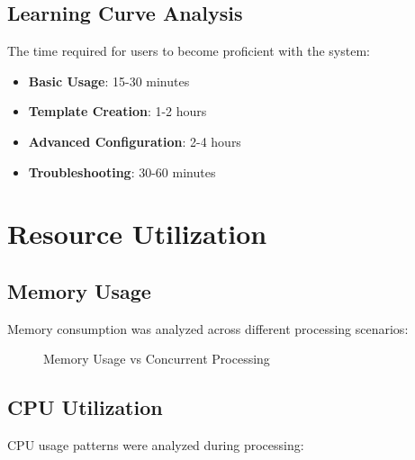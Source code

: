 \subsection{Learning Curve Analysis}

The time required for users to become proficient with the system:

\begin{itemize}
\item \textbf{Basic Usage}: 15-30 minutes
\item \textbf{Template Creation}: 1-2 hours
\item \textbf{Advanced Configuration}: 2-4 hours
\item \textbf{Troubleshooting}: 30-60 minutes
\end{itemize}

\section{Resource Utilization}

\subsection{Memory Usage}

Memory consumption was analyzed across different processing scenarios:

\begin{figure}[H]
\centering
{}
\caption{Memory Usage vs Concurrent Processing}
\label{fig:memory_usage}
\end{figure}

\subsection{CPU Utilization}

CPU usage patterns were analyzed during processing:

